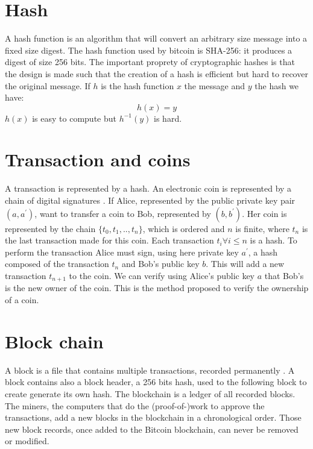 \documentclass[letterpaper]{article}
\begin{document}
\section*{Hash}

A hash function is an algorithm that will convert an arbitrary
size message into a fixed size digest. The hash function
used by bitcoin is SHA-256: it produces a digest of size 256 bits.
The important proprety of cryptographic hashes is that the design is made
such that the creation of a hash is efficient but hard to recover the
original message. If $h$ is the hash function $x$ the message and $y$ the hash
we have:
\begin{equation}
    h(x) = y
\end{equation}
$h(x)$ is easy to compute but $h^{-1}(y)$ is hard.

\section*{Transaction and coins}

A transaction is represented by a hash.
An electronic coin is represented by a
chain of digital signatures \cite{bitcoin}.
If Alice, represented by the public private key pair $(a, a^{'})$,
want to transfer a coin to Bob, represented by $(b, b^{'})$. Her coin
is represented by the chain $\{t_0, t_1, .., t_n \}$, which is ordered
and $n$ is finite, where
$t_n$ is the last transaction made for this coin. Each transaction
$t_i \forall i \le n$ is a hash. To perform the transaction
Alice must sign, using
here private key $a^{'}$,
a hash composed of the transaction $t_n$ and Bob's public key $b$.
This will add a new
transaction $t_{n+1}$ to the coin. We can verify using Alice's public key $a$
that Bob's is the new owner of the coin.
This is the method proposed to verify the ownership of a coin.

\section*{Block chain}

A block is a file that contains multiple transactions,
recorded permanently \cite{bitcoinwiki}. A block contains also a block header,
a 256 bits hash, used to the following block to create generate its own hash.
The blockchain is a ledger of all
recorded blocks. The miners, the computers that do the (proof-of-)work to
approve the transactions, add a new blocks in the blockchain in a
chronological order. Those new block records,
once added to the Bitcoin blockchain, can never be removed or modified.
\end{document}
